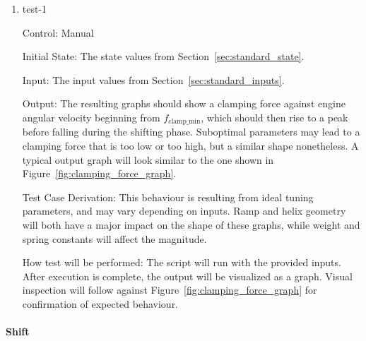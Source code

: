 \documentclass[12pt, titlepage]{article}
\begin{document}
\begin{enumerate}
  
  \item{test-1\\}
  
  Control: Manual
            
  Initial State: The state values from Section~\ref{sec:standard_state}.
  
  Input: The input values from Section~\ref{sec:standard_inputs}.
            
  Output: The resulting graphs should show a clamping force against engine angular velocity beginning from $f_\text{clamp\_min}$, which should then rise to a peak before falling during the shifting phase. Suboptimal parameters may lead to a clamping force that is too low or too high, but a similar shape nonetheless. A typical output graph will look similar to the one shown in Figure~\ref{fig:clamping_force_graph}.
  
  Test Case Derivation: This behaviour is resulting from ideal tuning parameters, and may vary depending on inputs. Ramp and helix geometry will both have a major impact on the shape of these graphs, while weight and spring constants will affect the magnitude.
  
  How test will be performed: The script will run with the provided inputs. After execution is complete, the output will be visualized as a graph. Visual inspection will follow against Figure~\ref{fig:clamping_force_graph} for confirmation of expected behaviour.
  
\end{enumerate}

\paragraph{Shift}
\end{document}
